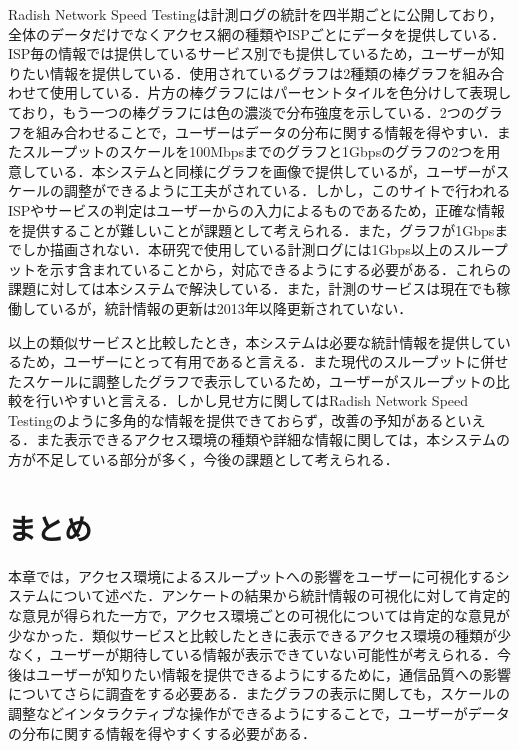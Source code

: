 Radish Network Speed Testingは計測ログの統計を四半期ごとに公開しており，全体のデータだけでなくアクセス網の種類やISPごとにデータを提供している．ISP毎の情報では提供しているサービス別でも提供しているため，ユーザーが知りたい情報を提供している．使用されているグラフは2種類の棒グラフを組み合わせて使用している．片方の棒グラフにはパーセントタイルを色分けして表現しており，もう一つの棒グラフには色の濃淡で分布強度を示している．2つのグラフを組み合わせることで，ユーザーはデータの分布に関する情報を得やすい．またスループットのスケールを100Mbpsまでのグラフと1Gbpsのグラフの2つを用意している．本システムと同様にグラフを画像で提供しているが，ユーザーがスケールの調整ができるように工夫がされている．しかし，このサイトで行われるISPやサービスの判定はユーザーからの入力によるものであるため，正確な情報を提供することが難しいことが課題として考えられる．また，グラフが1Gbpsまでしか描画されない．本研究で使用している計測ログには1Gbps以上のスループットを示す含まれていることから，対応できるようにする必要がある．これらの課題に対しては本システムで解決している．また，計測のサービスは現在でも稼働しているが，統計情報の更新は2013年以降更新されていない．

以上の類似サービスと比較したとき，本システムは必要な統計情報を提供しているため，ユーザーにとって有用であると言える．また現代のスループットに併せたスケールに調整したグラフで表示しているため，ユーザーがスループットの比較を行いやすいと言える．しかし見せ方に関してはRadish Network Speed Testingのように多角的な情報を提供できておらず，改善の予知があるといえる．また表示できるアクセス環境の種類や詳細な情報に関しては，本システムの方が不足している部分が多く，今後の課題として考えられる．

\section{まとめ}
本章では，アクセス環境によるスループットへの影響をユーザーに可視化するシステムについて述べた．アンケートの結果から統計情報の可視化に対して肯定的な意見が得られた一方で，アクセス環境ごとの可視化については肯定的な意見が少なかった．類似サービスと比較したときに表示できるアクセス環境の種類が少なく，ユーザーが期待している情報が表示できていない可能性が考えられる．今後はユーザーが知りたい情報を提供できるようにするために，通信品質への影響についてさらに調査をする必要ある．またグラフの表示に関しても，スケールの調整などインタラクティブな操作ができるようにすることで，ユーザーがデータの分布に関する情報を得やすくする必要がある．